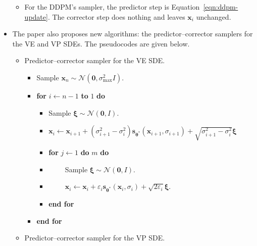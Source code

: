 \documentclass[10pt]{article}
\newcommand{\ve}[1]{\mathbf{#1}}
\newcommand{\ves}[1]{\boldsymbol{#1}}
\newcommand{\mcal}[1]{\mathcal{#1}}
\begin{document}
\begin{itemize}
\begin{itemize}
    \item For the DDPM's sampler, the predictor step is Equation~\ref{eqn:ddpm-update}. The corrector step does nothing and leaves $\ve{x}_i$ unchanged.
  \end{itemize}

  \item The paper also proposes new algorithms: the predictor--corrector samplers for the VE and VP SDEs. The pseudocodes are given below.
  
  \begin{itemize}
    \item Predictor--corrector sampler for the VE SDE.
    \begin{itemize}
      \item[] Sample $\ve{x}_n \sim \mcal{N}(\ve{0},\sigma_{\max}^2 I)$.
      \item[] {\bf for} $i \gets n-1$ {\bf to} $1$ {\bf do}
      \begin{itemize}
        \item[] Sample $\ves{\xi} \sim \mcal{N}(\ve{0}, I)$.
        \item[] $\ve{x}_{i} \gets \ve{x}_{i+1} + (\sigma_{i+1}^2 - \sigma_i^2) \ve{s}_{\ves{\theta}^*}(\ve{x}_{i+1}, \sigma_{i+1}) + \sqrt{\sigma_{i+1}^2 - \sigma_i^2}\ves{\xi}$
        \item[] {\bf for} $j \gets 1$ {\bf do} $m$ {\bf do}        
        \item[] $\qquad$ Sample $\ves{\xi} \sim \mcal{N}(\ve{0}, I)$.
        \item[] $\qquad$ $\ve{x}_i \gets \ve{x}_i + \varepsilon_i \ve{s}_{\ves{\theta}^*}(\ve{x}_{i}, \sigma_{i}) + \sqrt{2 \varepsilon_i} \ves{\xi}$.
        \item[] {\bf end for}
      \end{itemize}
      \item[] {\bf end for}
    \end{itemize}
    
    \item Predictor--corrector sampler for the VP SDE.
    

\end{itemize}
\end{itemize}
\end{document}

